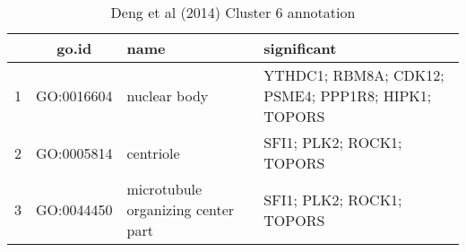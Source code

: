 \begin{table}[htp]
\begin{center}
\caption{Deng et al (2014) Cluster 6 annotation} \label{tab:tab10}
\begin{tabular}{|c|c|p{1.5in}|p{4in}|}
  \hline
 & go.id & name  & significant \\ 
  \hline
1 & GO:0016604 & nuclear body  & \footnotesize{YTHDC1; RBM8A; CDK12; PSME4; PPP1R8; HIPK1; TOPORS} \\ 
  2 & GO:0005814 & centriole  & \footnotesize{SFI1; PLK2; ROCK1; TOPORS} \\ 
  3 & GO:0044450 & microtubule organizing center part  & \footnotesize{SFI1; PLK2; ROCK1; TOPORS} \\ 
   \hline
\end{tabular}
 \end{center} \label{tab:tab10}
  \end{table}
\clearpage




